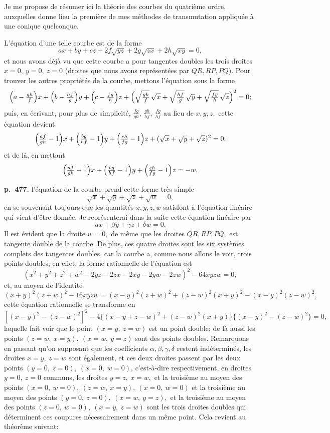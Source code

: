 \documentclass[11pt]{article}
\begin{document}
Je me propose de r\'esumer ici la th\'eorie des courbes du quatri\`eme ordre, auxquelles donne lieu la premi\`ere de mes m\'ethodes de transmutation appliqu\'ee \`a une conique quelconque.

L'\'equation d'une telle courbe est de la forme
\[ ax + by + cz + 2f\sqrt{yz} + 2g\sqrt{zx} + 2h\sqrt{xy} = 0, \]
et nous avons d\'ej\`a vu que cette courbe a pour tangentes doubles les trois droites $x = 0,\ y = 0,\ z = 0$ (droites que nous avons repr\'esent\'ees par $QR, RP, PQ$). Pour trouver les autres propri\'et\'es de la courbe, mettons l'\'equation sous la forme
\[ \Bigl(a - \tfrac{gh}{f}\Bigr)x + \Bigl(b - \tfrac{hf}{g}\Bigr)y + \Bigl(c - \tfrac{fg}{h}\Bigr)z + \Bigl(\sqrt{\tfrac{gh}{f}}\,\sqrt{x} + \sqrt{\tfrac{hf}{g}}\,\sqrt{y} + \sqrt{\tfrac{fg}{h}}\,\sqrt{z}\Bigr)^2 = 0; \]
puis, en \'ecrivant, pour plus de simplicit\'e, $\tfrac{fg}{gh},\ \tfrac{gh}{hf},\ \tfrac{fg}{hf}$ au lieu de $x, y, z,$ cette \'equation devient
\[ \Bigl(\tfrac{af}{gh} - 1\Bigr)x + \Bigl(\tfrac{bg}{hf} - 1\Bigr)y + \Bigl(\tfrac{ch}{fg} - 1\Bigr)z + (\sqrt{x} + \sqrt{y} + \sqrt{z})^2 = 0; \]
et de l\`a, en mettant
\[ \Bigl(\tfrac{af}{gh} - 1\Bigr)x + \Bigl(\tfrac{bg}{hf} - 1\Bigr)y + \Bigl(\tfrac{ch}{fg} - 1\Bigr)z = -w, \]

\bigskip
\noindent\textbf{p.~477.} l'\'equation de la courbe prend cette forme tr\`es simple
\[ \sqrt{x} + \sqrt{y} + \sqrt{z} + \sqrt{w} = 0, \]
en se souvenant toujours que les quantit\'es $x, y, z, w$ satisfont \`a l'\'equation lin\'eaire qui vient d'\^etre donn\'ee. Je repr\'esenterai dans la suite cette \'equation lin\'eaire par
\[ ax + \beta y + \gamma z + \delta w = 0. \]
Il est \'evident que la droite $w = 0,$ de m\^eme que les droites $QR, RP, PQ,$ est tangente double de la courbe. De plus, ces quatre droites sont les six syst\`emes complets des tangentes doubles, car la courbe a, comme nous allons le voir, trois points doubles; en effet, la forme rationnelle de l'\'equation est
\[ (x^2 + y^2 + z^2 + w^2 - 2yz - 2zx - 2xy - 2yw - 2zw)^2 - 64xyzw = 0, \]
et, au moyen de l'identit\'e
\[ (x + y)^2(z + w)^2 - 16xyzw = (x - y)^2(z + w)^2 + (z - w)^2(x + y)^2 - (x - y)^2(z - w)^2, \]
cette \'equation rationnelle se transforme en
\[ [(x - y)^2 - (z - w)^2]^2 - 4\{(x - y + z - w)^2 + (z - w)^2(x + y)\}\{(x - y)^2 - (z - w)^2\} = 0, \]
laquelle fait voir que le point $(x = y,\ z = w)$ est un point double; de l\`a aussi les points $(z = w,\ x = y),\ (x = w,\ y = z)$ sont des points doubles. Remarquons en passant qu'on supposant que les coefficients $\alpha, \beta, \gamma, \delta$ restent ind\'etermin\'es, les droites $x = y,\ z = w$ sont \'egalement, et ces deux droites passent par les deux points $(y = 0,\ z = 0),\ (x = 0,\ w = 0)$, c'est-\`a-dire respectivement, en droites $y = 0,\ z = 0$ communs, les droites $y = z,\ x = w,$ et la troisi\`eme au moyen des points $(x = 0,\ w = 0),\ (z = w,\ x = y),\ (x = 0,\ w = 0)$ et la troisi\`eme au moyen des points $(y = 0,\ z = 0),\ (x = w,\ y = z),$ et la troisi\`eme au moyen des points $(z = 0,\ w = 0),\ (x = y,\ z = w)$ sont les trois droites doubles qui d\'eterminent ces coupures n\'ecessairement dans un m\^eme point. Cela revient au th\'eor\`eme suivant:
\end{document}
